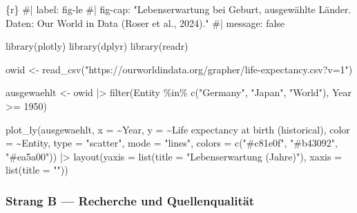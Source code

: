 \documentclass[
  ngerman,
  a4paper,
  DIV=11]{scrreprt}
\newenvironment{Shaded}{\begin{snugshade}}{\end{snugshade}}
\newcommand{\AttributeTok}[1]{\textcolor[rgb]{0.40,0.45,0.13}{#1}}
\newcommand{\CommentTok}[1]{\textcolor[rgb]{0.37,0.37,0.37}{#1}}
\newcommand{\DecValTok}[1]{\textcolor[rgb]{0.68,0.00,0.00}{#1}}
\newcommand{\FunctionTok}[1]{\textcolor[rgb]{0.28,0.35,0.67}{#1}}
\newcommand{\InformationTok}[1]{\textcolor[rgb]{0.37,0.37,0.37}{#1}}
\newcommand{\NormalTok}[1]{\textcolor[rgb]{0.00,0.23,0.31}{#1}}
\newcommand{\OtherTok}[1]{\textcolor[rgb]{0.00,0.23,0.31}{#1}}
\newcommand{\SpecialCharTok}[1]{\textcolor[rgb]{0.37,0.37,0.37}{#1}}
\newcommand{\StringTok}[1]{\textcolor[rgb]{0.13,0.47,0.30}{#1}}
\begin{document}
\begin{Shaded}
\begin{Highlighting}[]
\InformationTok{\textasciigrave{}\textasciigrave{}\textasciigrave{}\{r\}}
\CommentTok{\#| label: fig{-}le}
\CommentTok{\#| fig{-}cap: "Lebenserwartung bei Geburt, ausgewählte Länder. Daten: Our World in Data (Roser et al., 2024)."}
\CommentTok{\#| message: false}

\FunctionTok{library}\NormalTok{(plotly)}
\FunctionTok{library}\NormalTok{(dplyr)}
\FunctionTok{library}\NormalTok{(readr)}

\NormalTok{owid }\OtherTok{\textless{}{-}} \FunctionTok{read\_csv}\NormalTok{(}\StringTok{"https://ourworldindata.org/grapher/life{-}expectancy.csv?v=1"}\NormalTok{)}

\NormalTok{ausgewaehlt }\OtherTok{\textless{}{-}}\NormalTok{ owid }\SpecialCharTok{|\textgreater{}}
  \FunctionTok{filter}\NormalTok{(Entity }\SpecialCharTok{\%in\%} \FunctionTok{c}\NormalTok{(}\StringTok{"Germany"}\NormalTok{, }\StringTok{"Japan"}\NormalTok{, }\StringTok{"World"}\NormalTok{),}
\NormalTok{         Year }\SpecialCharTok{\textgreater{}=} \DecValTok{1950}\NormalTok{)}

\FunctionTok{plot\_ly}\NormalTok{(ausgewaehlt,}
        \AttributeTok{x =} \SpecialCharTok{\textasciitilde{}}\NormalTok{Year, }\AttributeTok{y =} \SpecialCharTok{\textasciitilde{}}\StringTok{\textasciigrave{}}\AttributeTok{Life expectancy at birth (historical)}\StringTok{\textasciigrave{}}\NormalTok{,}
        \AttributeTok{color =} \SpecialCharTok{\textasciitilde{}}\NormalTok{Entity, }\AttributeTok{type =} \StringTok{"scatter"}\NormalTok{, }\AttributeTok{mode =} \StringTok{"lines"}\NormalTok{,}
        \AttributeTok{colors =} \FunctionTok{c}\NormalTok{(}\StringTok{"\#c81e0f"}\NormalTok{, }\StringTok{"\#b43092"}\NormalTok{, }\StringTok{"\#ea5a00"}\NormalTok{)) }\SpecialCharTok{|\textgreater{}}
  \FunctionTok{layout}\NormalTok{(}\AttributeTok{yaxis =} \FunctionTok{list}\NormalTok{(}\AttributeTok{title =} \StringTok{"Lebenserwartung (Jahre)"}\NormalTok{),}
         \AttributeTok{xaxis =} \FunctionTok{list}\NormalTok{(}\AttributeTok{title =} \StringTok{""}\NormalTok{))}
\InformationTok{\textasciigrave{}\textasciigrave{}\textasciigrave{}}
\end{Highlighting}
\end{Shaded}

\subsubsection{Strang B --- Recherche und Quellenqualität}
\end{document}
